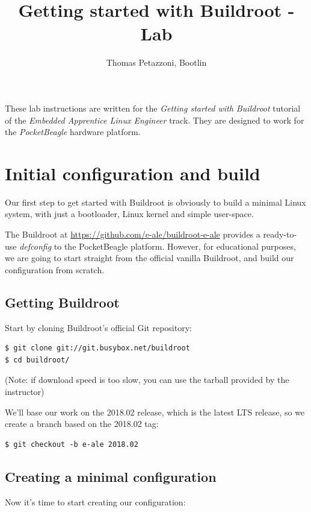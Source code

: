 \documentclass[a4paper,12pt,obeyspaces,spaces,hyphens]{article}
\title{Getting started with Buildroot - Lab}
\author{Thomas Petazzoni, Bootlin}
\newcommand{\code}[1]
{\path{#1}}
\begin{document}
\maketitle
\thispagestyle{fancy}

These lab instructions are written for the {\em Getting started with
  Buildroot} tutorial of the {\em Embedded Apprentice Linux Engineer}
track. They are designed to work for the {\em PocketBeagle} hardware
platform.

\section{Initial configuration and build}

Our first step to get started with Buildroot is obviously to build a
minimal Linux system, with just a bootloader, Linux kernel and simple
user-space.

The Buildroot at \url{https://github.com/e-ale/buildroot-e-ale}
provides a ready-to-use {\em defconfig} to the PocketBeagle
platform. However, for educational purposes, we are going to start
straight from the official vanilla Buildroot, and build our
configuration from scratch.

\subsection{Getting Buildroot}

Start by cloning Buildroot's official Git repository:

\begin{verbatim}
$ git clone git://git.busybox.net/buildroot
$ cd buildroot/
\end{verbatim}

(Note: if download speed is too slow, you can use the
\code{buildroot.tar.xz} tarball provided by the instructor)

We'll base our work on the 2018.02 release, which is the latest LTS
release, so we create a branch based on the 2018.02 tag:

\begin{verbatim}
$ git checkout -b e-ale 2018.02
\end{verbatim}

\subsection{Creating a minimal configuration}

Now it's time to start creating our configuration:
\end{document}
